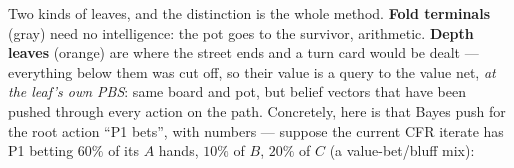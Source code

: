 \documentclass[11pt,a4paper]{article}
\begin{document}
\begin{center}
\end{center}

Two kinds of leaves, and the distinction is the whole method. \textbf{Fold
terminals} (gray) need no intelligence: the pot goes to the survivor,
arithmetic. \textbf{Depth leaves} (orange) are where the street ends and a
turn card would be dealt --- everything below them was cut off, so their
value is a query to the value net, \emph{at the leaf's own PBS}: same board
and pot, but belief vectors that have been pushed through every action on
the path. Concretely, here is that Bayes push for the root action ``P1
bets'', with numbers --- suppose the current CFR iterate has P1 betting
$60\%$ of its $A$ hands, $10\%$ of $B$, $20\%$ of $C$ (a value-bet/bluff
mix):
\end{document}
